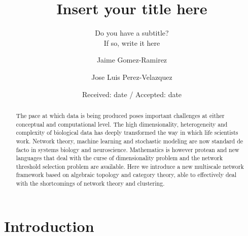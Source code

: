 \documentclass[onecollarge,runningheads]{svjour2}
\begin{document}
\title{Insert your title here%
}
\subtitle{Do you have a subtitle?\\ If so, write it here}
\author{Jaime Gomez-Ramirez        \and
        Jose Luis Perez-Velazquez %
}
\date{Received: date / Accepted: date}
\maketitle

\begin{abstract}
The pace at which data is being produced poses important challenges at either conceptual and computational level. The high dimensionality, heterogeneity and complexity of biological data has deeply transformed the way in which life scientists work. Network theory, machine learning and stochastic modeling are now standard de facto in systems biology and neuroscience. Mathematics is however protean and new languages that deal with the curse of dimensionality problem and the network threshold selection problem are available. Here we introduce a new multiscale network framework based on algebraic topology and category theory, able to effectively deal with the shortcomings of network theory and clustering.

\end{abstract}


\section{Introduction}
\end{document}
